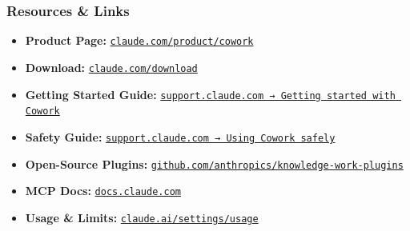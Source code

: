 \begin{frame}[fragile]\frametitle{Resources \& Links}
  \begin{itemize}
    \item \textbf{Product Page:} \href{https://claude.com/product/cowork}{\texttt{claude.com/product/cowork}}
    \item \textbf{Download:} \href{https://claude.com/download}{\texttt{claude.com/download}}
    \item \textbf{Getting Started Guide:} \href{https://support.claude.com/en/articles/13345190-getting-started-with-cowork}{\texttt{support.claude.com → Getting started with Cowork}}
    \item \textbf{Safety Guide:} \href{https://support.claude.com/en/articles/13364135-using-cowork-safely}{\texttt{support.claude.com → Using Cowork safely}}
    \item \textbf{Open-Source Plugins:} \href{https://github.com/anthropics/knowledge-work-plugins}{\texttt{github.com/anthropics/knowledge-work-plugins}}
    \item \textbf{MCP Docs:} \href{https://docs.claude.com}{\texttt{docs.claude.com}}
    \item \textbf{Usage \& Limits:} \href{https://claude.ai/settings/usage}{\texttt{claude.ai/settings/usage}}
  \end{itemize}
\end{frame}

